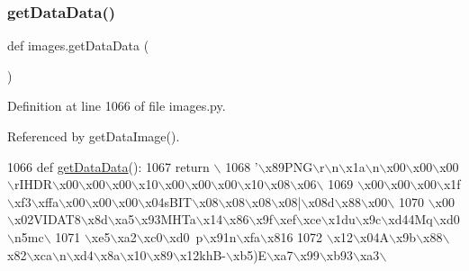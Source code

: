 \subsubsection{\texorpdfstring{get\+Data\+Data()}{getDataData()}}
{\footnotesize\ttfamily def images.\+get\+Data\+Data (\begin{DoxyParamCaption}{ }\end{DoxyParamCaption})}



Definition at line 1066 of file images.\+py.



Referenced by get\+Data\+Image().


\begin{DoxyCode}
1066 \textcolor{keyword}{def }\hyperlink{namespaceimages_ab1c77e22e2c32cd1bf3bb8fe77f8298d}{getDataData}():
1067     \textcolor{keywordflow}{return} \(\backslash\)
1068 \textcolor{stringliteral}{'\(\backslash\)x89PNG\(\backslash\)r\(\backslash\)n\(\backslash\)x1a\(\backslash\)n\(\backslash\)x00\(\backslash\)x00\(\backslash\)x00\(\backslash\)rIHDR\(\backslash\)x00\(\backslash\)x00\(\backslash\)x00\(\backslash\)x10\(\backslash\)x00\(\backslash\)x00\(\backslash\)x00\(\backslash\)x10\(\backslash\)x08\(\backslash\)x06\(\backslash\)}
1069 \textcolor{stringliteral}{\(\backslash\)x00\(\backslash\)x00\(\backslash\)x00\(\backslash\)x1f\(\backslash\)xf3\(\backslash\)xffa\(\backslash\)x00\(\backslash\)x00\(\backslash\)x00\(\backslash\)x04sBIT\(\backslash\)x08\(\backslash\)x08\(\backslash\)x08\(\backslash\)x08|\(\backslash\)x08d\(\backslash\)x88\(\backslash\)x00\(\backslash\)}
1070 \textcolor{stringliteral}{\(\backslash\)x00\(\backslash\)x02VIDAT8\(\backslash\)x8d\(\backslash\)xa5\(\backslash\)x93MHTa\(\backslash\)x14\(\backslash\)x86\(\backslash\)x9f\(\backslash\)xef\(\backslash\)xce\(\backslash\)x1du\(\backslash\)x9c\(\backslash\)xd44Mq\(\backslash\)xd0\(\backslash\)n5mc\(\backslash\)}
1071 \textcolor{stringliteral}{\(\backslash\)xe5\(\backslash\)xa2\(\backslash\)xc0\(\backslash\)xd0~p\(\backslash\)x91n\(\backslash\)xfa\(\backslash\)x816%
1072 \textcolor{stringliteral}{\(\backslash\)x12\(\backslash\)x04A\(\backslash\)x9b\(\backslash\)x88\(\backslash\)x82\(\backslash\)xca\(\backslash\)n\(\backslash\)xd4\(\backslash\)x8a\(\backslash\)x10\(\backslash\)x89\(\backslash\)x12khB-\(\backslash\)xb5)E\(\backslash\)xa7\(\backslash\)x99\(\backslash\)xb93\(\backslash\)xa3\(\backslash\)}
}
\end{DoxyCode}
